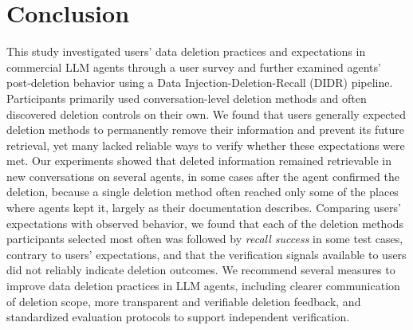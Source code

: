 \section{Conclusion}
\label{sec:conclusion}


This study investigated users' data deletion practices and expectations in commercial LLM agents through a user survey and further examined agents' post-deletion behavior using a Data Injection-Deletion-Recall (DIDR) pipeline.
%
Participants primarily used conversation-level deletion methods and often discovered deletion controls on their own.
%
We found that users generally expected deletion methods to permanently remove their information and prevent its future retrieval, yet many lacked reliable ways to verify whether these expectations were met.
%
Our experiments showed that deleted information remained retrievable in new conversations on several agents, in some cases after the agent confirmed the deletion, because a single deletion method often reached only some of the places where agents kept it, largely as their documentation describes.
%
Comparing users' expectations with observed behavior, we found that each of the deletion methods participants selected most often was followed by \textit{recall success} in some test cases, contrary to users' expectations, and that the verification signals available to users did not reliably indicate deletion outcomes.
%
We recommend several measures to improve data deletion practices in LLM agents, including clearer communication of deletion scope, more transparent and verifiable deletion feedback, and standardized evaluation protocols to support independent verification.
